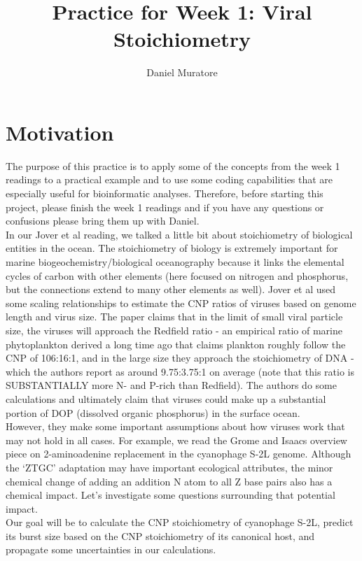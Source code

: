 \documentclass[11pt]{amsart}
\title{Practice for Week 1: Viral Stoichiometry}
\author{Daniel Muratore}
\begin{document}
\maketitle
\section{Motivation}
The purpose of this practice is to apply some of the concepts from the week 1 readings to a practical example and to use some coding capabilities that are especially useful for bioinformatic analyses. Therefore, before starting this project, please finish the week 1 readings and if you have any questions or confusions please bring them up with Daniel.\\
 In our Jover et al reading, we talked a little bit about stoichiometry of biological entities in the ocean. The stoichiometry of biology is extremely important for marine biogeochemistry/biological oceanography because it links the elemental cycles of carbon with other elements (here focused on nitrogen and phosphorus, but the connections extend to many other elements as well). Jover et al used some scaling relationships to estimate the CNP ratios of viruses based on genome length and virus size. The paper claims that in the limit of small viral particle size, the viruses will approach the Redfield ratio - an empirical ratio of marine phytoplankton derived a long time ago that claims plankton roughly follow the CNP of 106:16:1, and in the large size they approach the stoichiometry of DNA - which the authors report as around 9.75:3.75:1 on average (note that this ratio is SUBSTANTIALLY more N- and P-rich than Redfield). The authors do some calculations and ultimately claim that viruses could make up a substantial portion of DOP (dissolved organic phosphorus) in the surface ocean. \\
 However, they make some important assumptions about how viruses work that may not hold in all cases. For example, we read the Grome and Isaacs overview piece on 2-aminoadenine replacement in the cyanophage S-2L genome. Although the `ZTGC' adaptation may have important ecological attributes, the minor chemical change of adding an addition N atom to all Z base pairs also has a chemical impact. Let's investigate some questions surrounding that potential impact.\\
 Our goal will be to calculate the CNP stoichiometry of cyanophage S-2L, predict its burst size based on the CNP stoichiometry of its canonical host, and propagate some uncertainties in our calculations. 
\end{document}
